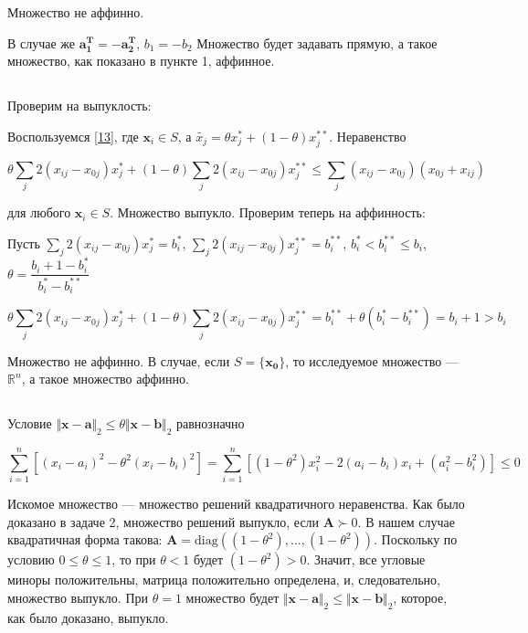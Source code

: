 	Множество не аффинно. 
	
	В случае же $\mathbf{a_1^T} = -\mathbf{a_2^T}$, $b_1 = -b_2$ Множество будет задавать прямую, а такое множество, как показано в пункте 1, аффинное.
	
	\subsection{}

	
	Проверим на выпуклость:
	
	Воспользуемся \eqref{13}, где $\mathbf{x}_i\in S$, а $\tilde{x_j} = \theta x_j^* + (1-\theta) x_j^{**}$. Неравенство
	
	\begin{equation}
	\theta\sum_j 2(x_{ij}-x_{0j}) x_j^* + (1-\theta) \sum_j 2(x_{ij}-x_{0j}) x_j^{**} \leqslant \sum_j (x_{ij}-x_{0j}) (x_{0j}+x_{ij}) 
	\end{equation}
	
	для любого $\mathbf{x}_i\in S$. Множество выпукло. Проверим теперь на аффинность:
	
	Пусть $\sum_j 2(x_{ij}-x_{0j}) x_j^* = b_i^*$, $\sum_j 2(x_{ij}-x_{0j}) x_j^{**} = b_i^{**}$, $b_i^* < b_i^{**} \leqslant b_i$, $\theta = \dfrac{b_i+1-b_i^*}{b_i^* - b_i^{**}}$
	
	\begin{equation}
	\theta\sum_j 2(x_{ij}-x_{0j}) x_j^* + (1-\theta) \sum_j 2(x_{ij}-x_{0j}) x_j^{**}  = b_i^{**} + \theta(b_i^* - b_i^{**}) = b_i +1 > b_i
	\end{equation}
	
	Множество не аффинно. В случае, если $S = \{\mathbf{x_0}\}$, то исследуемое множество --- $\mathbb{R}^n$, а такое множество аффинно.
	
	\subsection{}
	
	Условие $\Vert \mathbf{x} - \mathbf{a} \Vert_2 \leqslant \theta \Vert \mathbf{x} - \mathbf{b} \Vert_2$ равнозначно
	
	\begin{equation}
	\sum\limits_{i=1}^{n}\left[ (x_i - a_i)^2 - \theta^2 (x_i-b_i)^2 \right] = \sum\limits_{i=1}^{n}\left[(1-\theta^2)x_i^2 - 2(a_i-b_i)x_i + (a_i^2-b_i^2) \right] \leqslant 0
	\end{equation}
	
	Искомое множество --- множество решений квадратичного неравенства. Как было доказано в задаче 2, множество решений выпукло, если $\mathbf{A} \succ 0$. В нашем случае квадратичная форма такова: $\mathbf{A} = \text{diag}((1-\theta^2), ..., (1-\theta^2))$. Поскольку по условию $0 \leqslant \theta \leqslant 1$, то при $\theta < 1$ будет $(1-\theta^2) > 0$. Значит, все угловые миноры положительны, матрица положительно определена, и, следовательно, множество выпукло. При $\theta = 1$ множество будет $\Vert \mathbf{x} - \mathbf{a} \Vert_2 \leqslant  \Vert \mathbf{x} - \mathbf{b} \Vert_2$, которое, как было доказано, выпукло.
	
